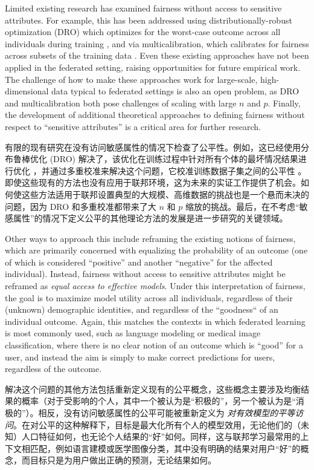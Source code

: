 Limited existing research has examined fairness without access to sensitive attributes. For example, this has been addressed using distributionally-robust optimization (DRO) which optimizes for the worst-case outcome across all individuals during training \cite{hashimoto2018fairness}, and via multicalibration, which calibrates for fairness across subsets of the training data \cite{hebert2018multicalibration}. Even these existing approaches have not been applied in the federated setting, raising opportunities for future empirical work. The challenge of how to make these approaches work for large-scale, high-dimensional data typical to federated settings is also an open problem, as DRO and multicalibration both pose challenges of scaling with large $n$ and $p$. Finally, the development of additional theoretical approaches to defining fairness without respect to ``sensitive attributes'' is a critical area for further research.


有限的现有研究在没有访问敏感属性的情况下检查了公平性。例如，这已经使用分布鲁棒优化 (DRO) 解决了，该优化在训练过程中针对所有个体的最坏情况结果进行优化 \cite{hashimoto2018fairness}，并通过多重校准来解决这个问题，它校准训练数据子集之间的公平性 \cite {hebert2018multicalibration}。即使这些现有的方法也没有应用于联邦环境，这为未来的实证工作提供了机会。如何使这些方法适用于联邦设置典型的大规模、高维数据的挑战也是一个悬而未决的问题，因为 DRO 和多重校准都带来了大 $n$ 和 $p$ 缩放的挑战。最后，在不考虑“敏感属性”的情况下定义公平的其他理论方法的发展是进一步研究的关键领域。



Other ways to approach this include reframing the existing notions of fairness, which are primarily concerned with equalizing the probability of an outcome (one of which is considered ``positive'' and another ``negative'' for the affected individual). Instead, fairness without access to sensitive attributes might be reframed as \textit{equal access to effective models}. Under this interpretation of fairness, the goal is to maximize model utility across all individuals, regardless of their (unknown) demographic identities, and regardless of the ``goodness`` of an individual outcome. Again, this matches the contexts in which federated learning is most commonly used, such as language modeling or medical image classification, where there is no clear notion of an outcome which is ``good'' for a user, and instead the aim is simply to make correct predictions for users, regardless of the outcome.

解决这个问题的其他方法包括重新定义现有的公平概念，这些概念主要涉及均衡结果的概率（对于受影响的个人，其中一个被认为是“积极的”，另一个被认为是“消极的”）。相反，没有访问敏感属性的公平可能被重新定义为 \textit{对有效模型的平等访问}。在对公平的这种解释下，目标是最大化所有个人的模型效用，无论他们的（未知）人口特征如何，也无论个人结果的“好”如何。同样，这与联邦学习最常用的上下文相匹配，例如语言建模或医学图像分类，其中没有明确的结果对用户“好”的概念，而目标只是为用户做出正确的预测，无论结果如何。


